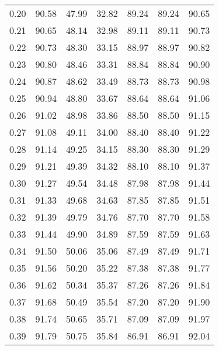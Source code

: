 \begin{tabular}{|c|c|c|c|c|c|c|}
      0.20 &     90.58 &     47.99 &      32.82 &   89.24 &      89.24 &         90.65 \\
      0.21 &     90.65 &     48.14 &      32.98 &   89.11 &      89.11 &         90.73 \\
      0.22 &     90.73 &     48.30 &      33.15 &   88.97 &      88.97 &         90.82 \\
      0.23 &     90.80 &     48.46 &      33.31 &   88.84 &      88.84 &         90.90 \\
      0.24 &     90.87 &     48.62 &      33.49 &   88.73 &      88.73 &         90.98 \\
      0.25 &     90.94 &     48.80 &      33.67 &   88.64 &      88.64 &         91.06 \\
      0.26 &     91.02 &     48.98 &      33.86 &   88.50 &      88.50 &         91.15 \\
      0.27 &     91.08 &     49.11 &      34.00 &   88.40 &      88.40 &         91.22 \\
      0.28 &     91.14 &     49.25 &      34.15 &   88.30 &      88.30 &         91.29 \\
      0.29 &     91.21 &     49.39 &      34.32 &   88.10 &      88.10 &         91.37 \\
      0.30 &     91.27 &     49.54 &      34.48 &   87.98 &      87.98 &         91.44 \\
      0.31 &     91.33 &     49.68 &      34.63 &   87.85 &      87.85 &         91.51 \\
      0.32 &     91.39 &     49.79 &      34.76 &   87.70 &      87.70 &         91.58 \\
      0.33 &     91.44 &     49.90 &      34.89 &   87.59 &      87.59 &         91.63 \\
      0.34 &     91.50 &     50.06 &      35.06 &   87.49 &      87.49 &         91.71 \\
      0.35 &     91.56 &     50.20 &      35.22 &   87.38 &      87.38 &         91.77 \\
      0.36 &     91.62 &     50.34 &      35.37 &   87.26 &      87.26 &         91.84 \\
      0.37 &     91.68 &     50.49 &      35.54 &   87.20 &      87.20 &         91.90 \\
      0.38 &     91.74 &     50.65 &      35.71 &   87.09 &      87.09 &         91.97 \\
      0.39 &     91.79 &     50.75 &      35.84 &   86.91 &      86.91 &         92.04 \\

\end{tabular}
